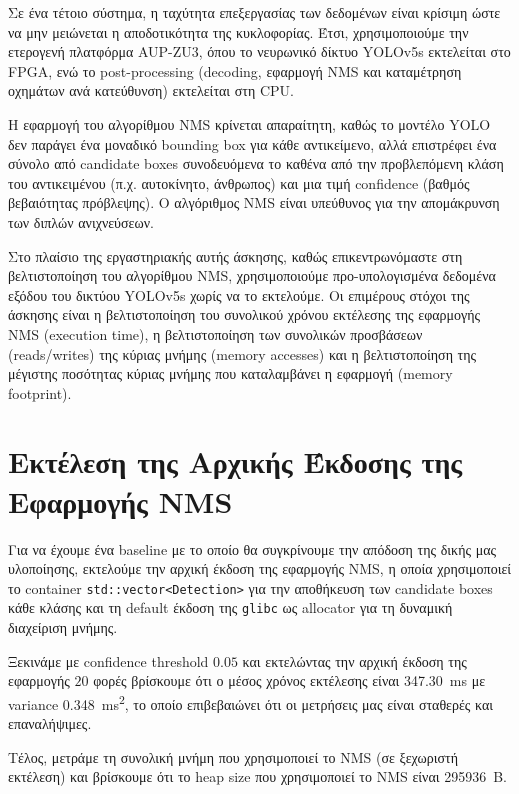 \documentclass[12pt]{article}
\begin{document}
Σε ένα τέτοιο σύστημα, η ταχύτητα επεξεργασίας των δεδομένων είναι κρίσιμη ώστε να μην μειώνεται η αποδοτικότητα της κυκλοφορίας. Έτσι, χρησιμοποιούμε την ετερογενή πλατφόρμα AUP-ZU3, όπου το νευρωνικό δίκτυο YOLOv5s εκτελείται στο FPGA, ενώ το post-processing (decoding, εφαρμογή NMS και καταμέτρηση οχημάτων ανά κατεύθυνση) εκτελείται στη CPU.

Η εφαρμογή του αλγορίθμου NMS κρίνεται απαραίτητη, καθώς το μοντέλο YOLO δεν παράγει ένα μοναδικό bounding box για κάθε αντικείμενο, αλλά επιστρέφει ένα σύνολο από candidate boxes συνοδευόμενα το καθένα από την προβλεπόμενη κλάση του αντικειμένου (π.χ. αυτοκίνητο, άνθρωπος) και μια τιμή confidence (βαθμός βεβαιότητας πρόβλεψης). Ο αλγόριθμος NMS είναι υπεύθυνος για την απομάκρυνση των διπλών ανιχνεύσεων.

Στο πλαίσιο της εργαστηριακής αυτής άσκησης, καθώς επικεντρωνόμαστε στη βελτιστοποίηση του αλγορίθμου NMS, χρησιμοποιούμε προ-υπολογισμένα δεδομένα εξόδου του δικτύου YOLOv5s χωρίς να το εκτελούμε. Οι επιμέρους στόχοι της άσκησης είναι η βελτιστοποίηση του συνολικού χρόνου εκτέλεσης της εφαρμογής NMS (execution time), η βελτιστοποίηση των συνολικών προσβάσεων (reads/writes) της κύριας μνήμης (memory accesses) και η βελτιστοποίηση της μέγιστης ποσότητας κύριας μνήμης που καταλαμβάνει η εφαρμογή (memory footprint).

\section{Εκτέλεση της Αρχικής Έκδοσης της Εφαρμογής NMS}
Για να έχουμε ένα baseline με το οποίο θα συγκρίνουμε την απόδοση της δικής μας υλοποίησης, εκτελούμε την αρχική έκδοση της εφαρμογής NMS, η οποία χρησιμοποιεί το container \texttt{std::vector<Detection>} για την αποθήκευση των candidate boxes κάθε κλάσης  και τη default έκδοση της \texttt{glibc} ως allocator για τη δυναμική διαχείριση μνήμης.

Ξεκινάμε με confidence threshold $0.05$ και εκτελώντας την αρχική έκδοση της εφαρμογής $20$ φορές βρίσκουμε ότι ο μέσος χρόνος εκτέλεσης είναι \qty{347.30}{\milli\second} με variance \qty{0.348}{\milli\second\squared}, το οποίο επιβεβαιώνει ότι οι μετρήσεις μας είναι σταθερές και επαναλήψιμες.

Τέλος, μετράμε τη συνολική μνήμη που χρησιμοποιεί το NMS (σε ξεχωριστή εκτέλεση) και βρίσκουμε ότι το heap size που χρησιμοποιεί το NMS είναι \qty{295936}{B}.
\end{document}
